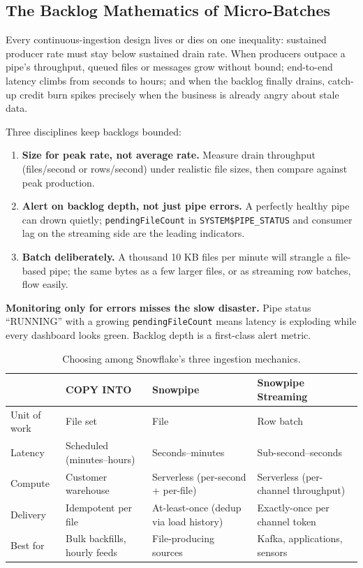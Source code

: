 \subsection{The Backlog Mathematics of Micro-Batches}
Every continuous-ingestion design lives or dies on one inequality: sustained producer rate must stay below sustained drain rate. When producers outpace a pipe's throughput, queued files or messages grow without bound; end-to-end latency climbs from seconds to hours; and when the backlog finally drains, catch-up credit burn spikes precisely when the business is already angry about stale data.

Three disciplines keep backlogs bounded:
\begin{enumerate}
    \item \textbf{Size for peak rate, not average rate.} Measure drain throughput (files/second or rows/second) under realistic file sizes, then compare against peak production.
    \item \textbf{Alert on backlog depth, not just pipe errors.} A perfectly healthy pipe can drown quietly; \texttt{pendingFileCount} in \texttt{SYSTEM\$PIPE\_STATUS} and consumer lag on the streaming side are the leading indicators.
    \item \textbf{Batch deliberately.} A thousand 10 KB files per minute will strangle a file-based pipe; the same bytes as a few larger files, or as streaming row batches, flow easily.
\end{enumerate}

\begin{pitfall}
\textbf{Monitoring only for errors misses the slow disaster.} Pipe status ``RUNNING'' with a growing \texttt{pendingFileCount} means latency is exploding while every dashboard looks green. Backlog depth is a first-class alert metric.
\end{pitfall}

\begin{table}[H]
\centering
\small
\begin{tabular}{@{}p{3.4cm}p{3.2cm}p{3.2cm}p{3.2cm}@{}}
\toprule
 & \textbf{COPY INTO} & \textbf{Snowpipe} & \textbf{Snowpipe Streaming} \\
\midrule
Unit of work & File set & File & Row batch \\
Latency & Scheduled (minutes--hours) & Seconds--minutes & Sub-second--seconds \\
Compute & Customer warehouse & Serverless (per-second + per-file) & Serverless (per-channel throughput) \\
Delivery & Idempotent per file & At-least-once (dedup via load history) & Exactly-once per channel token \\
Best for & Bulk backfills, hourly feeds & File-producing sources & Kafka, applications, sensors \\
\bottomrule
\end{tabular}
\caption{Choosing among Snowflake's three ingestion mechanics.}
\label{tab:chapter6-ingestion-comparison}
\end{table}

